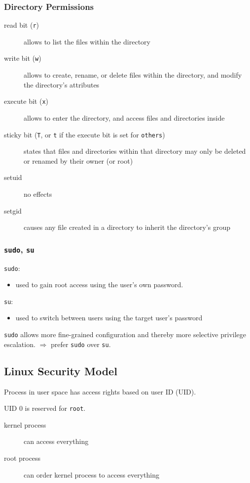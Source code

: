 \subsubsection{Directory Permissions}
\begin{description}
  \item[read bit (\texttt{r})] allows to list the files within the directory
  \item[write bit (\texttt{w})] allows to create, rename, or delete files
    within the directory, and modify the directory's attributes
  \item[execute bit (\texttt{x})] allows  to enter the directory, and access
    files and directories inside
  \item[sticky bit (\texttt{T}, or \texttt{t} if the execute bit is set for
    \texttt{others})] states that files and directories within that directory
    may only be deleted or renamed by their owner (or root)
  \item[setuid] no effects
  \item[setgid] causes any file created in a directory to inherit the
    directory's group
\end{description}

\subsubsection{\texttt{sudo}, \texttt{su}}

\texttt{sudo}:
\begin{itemize}
  \item used to gain root access using the user's own password.
\end{itemize}
\texttt{su}:
\begin{itemize}
  \item used to switch between users using the target user's password
\end{itemize}
\texttt{sudo} allows more fine-grained configuration and thereby more selective
privilege escalation. $\Rightarrow$ prefer \texttt{sudo} over \texttt{su}.

\subsection{Linux Security Model}
Process in user space has access rights based on user ID (UID).

UID 0 is reserved for \texttt{root}.
\begin{description}
    \item[kernel process] can access everything
    \item[root process] can order kernel process to access everything
\end{description}

